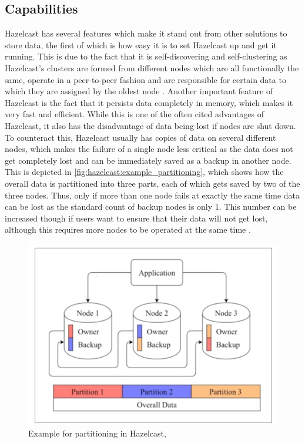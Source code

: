 \subsection{Capabilities} \label{subsec:capabilitiesHazelcast}
Hazelcast has several features which make it stand out from other solutions to store data, the first of which is how easy it is 
to set Hazelcast up and get it running. This is due to the fact that it is self-discovering and self-clustering as Hazelcast's 
clusters are formed from different nodes which are all functionally the same, operate in a peer-to-peer fashion and are responsible for 
certain data to which they are assigned by the oldest node \parencite{Johns.2015}. 
\newline
Another important feature of Hazelcast is the fact that it persists data completely in memory, which makes it very fast and efficient.
While this is one of the often cited advantages of Hazelcast, it also has the disadvantage of data being lost if nodes are shut down. To counteract this, Hazelcast usually has copies of data on several different nodes, which 
makes the failure of a single node less critical as the data does not get completely lost and can be immediately saved as a backup 
in another node. This is depicted in \autoref{fig:hazelcast:example_partitioning}, which shows how the overall data is partitioned into three parts, each of which gets saved by two of the three nodes. Thus, only if more than 
one node fails at exactly the same time data can be lost as the standard count of backup nodes is only 1. This number can be increased though if users want to 
ensure that their data will not get lost, although this requires more nodes to be operated at the same time \parencite{Johns.2015}. \newline

\begin{figure}[H]
    \centering
    \includegraphics[width=16cm]{images/hazelcast_partitioning.png}
    \caption[Example for partitioning in Hazelcast]{Example for partitioning in Hazelcast, \parencite{Johns.2015}}
    \label{fig:hazelcast:example_partitioning}
\end{figure}

